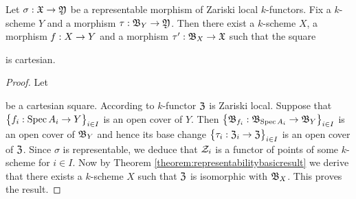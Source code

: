 \begin{proposition}\label{proposition:representablearerepresentableafterarbitrarybasechange}
Let $\sigma:{\mathfrak X}\rightarrow {\mathfrak Y}$ be a representable morphism of Zariski local $k$-functors. Fix a $k$-scheme $Y$ and a morphism $\tau:{\mathfrak B}_Y\rightarrow {\mathfrak Y}$. Then there exist a $k$-scheme $X$, a morphism $f:X\rightarrow Y$ and a morphism $\tau':{\mathfrak B}_X\rightarrow {\mathfrak X}$ such that the square
\begin{center}
\end{center}
is cartesian.
\end{proposition}
\begin{proof}
Let
\begin{center}
\end{center}
be a cartesian square. According to {\cite[Theorem 2.12]{Sheaves}} $k$-functor ${\mathfrak Z}$ is Zariski local. Suppose that $\big\{f_i:\mathrm{Spec}\, A_i\rightarrow Y\big\}_{i\in I}$ is an open cover of $Y$. Then $\big\{{\mathfrak B}_{f_i}:{\mathfrak B}_{\mathrm{Spec}\, A_i}\rightarrow {\mathfrak B}_Y\big\}_{i\in I}$ is an open cover of ${\mathfrak B}_Y$ and hence its base change $\big\{\tau_i:{\mathfrak Z}_i\rightarrow {\mathfrak Z}\big\}_{i\in I}$ is an open cover of ${\mathfrak Z}$. Since $\sigma$ is representable, we deduce that ${\mathcal Z}_i$ is a functor of points of some $k$-scheme for $i\in I$. Now by Theorem \ref{theorem:representabilitybasicresult} we derive that there exists a $k$-scheme $X$ such that ${\mathfrak Z}$ is isomorphic with ${\mathfrak B}_X$. This proves the result.
\end{proof}

